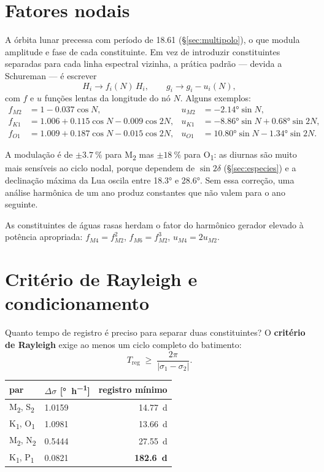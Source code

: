 \documentclass[11pt,a4paper,oneside]{report}
\theoremstyle{definition}
\theoremstyle{plain}
\theoremstyle{remark}
\begin{document}
\section{Fatores nodais}

A órbita lunar precessa com período de \SI{18.61}{\anos} (\S\ref{sec:multipolo}),
o que modula amplitude e fase de cada constituinte. Em vez de introduzir
constituintes separadas para cada linha espectral vizinha, a prática padrão —
devida a Schureman — é escrever
\begin{equation}
H_i\to f_i(N)\,H_i,\qquad g_i\to g_i-u_i(N),
\end{equation}
com $f$ e $u$ funções lentas da longitude do nó $N$. Alguns exemplos:
\begin{align}
f_{M2}&=1-\num{0.037}\cos N, & u_{M2}&=-\ang{2.14}\sin N,\\
f_{K1}&=\num{1.006}+\num{0.115}\cos N-\num{0.009}\cos 2N,
& u_{K1}&=-\ang{8.86}\sin N+\ang{0.68}\sin 2N,\\
f_{O1}&=\num{1.009}+\num{0.187}\cos N-\num{0.015}\cos 2N,
& u_{O1}&=\ang{10.80}\sin N-\ang{1.34}\sin 2N .
\end{align}

A modulação é de $\pm\SI{3.7}{\percent}$ para M\textsubscript{2} mas
$\pm\SI{18}{\percent}$ para O\textsubscript{1}: as diurnas são muito mais
sensíveis ao ciclo nodal, porque dependem de $\sin 2\delta$
(\S\ref{sec:especies}) e a declinação máxima da Lua oscila entre \ang{18.3} e
\ang{28.6}. Sem essa correção, uma análise harmônica de um ano produz
constantes que não valem para o ano seguinte.

As constituintes de águas rasas herdam o fator do harmônico gerador elevado à
potência apropriada: $f_{M4}=f_{M2}^{2}$, $f_{M6}=f_{M2}^{3}$,
$u_{M4}=2u_{M2}$.

\section{Critério de Rayleigh e condicionamento}
\label{sec:rayleigh}

Quanto tempo de registro é preciso para separar duas constituintes? O
\textbf{critério de Rayleigh} exige ao menos um ciclo completo do batimento:
\begin{equation}
T_{\text{reg}}\;\ge\;\frac{2\pi}{|\sigma_1-\sigma_2|} .
\label{eq:rayleigh}
\end{equation}

\begin{center}
\begin{tabular}{@{}llr@{}}
\toprule
par & $\Delta\sigma$ [\si{\degree\per\hour}] & registro mínimo \\
\midrule
M\textsubscript{2}, S\textsubscript{2} & \num{1.0159} & \SI{14.77}{\day} \\
K\textsubscript{1}, O\textsubscript{1} & \num{1.0981} & \SI{13.66}{\day} \\
M\textsubscript{2}, N\textsubscript{2} & \num{0.5444} & \SI{27.55}{\day} \\
K\textsubscript{1}, P\textsubscript{1} & \num{0.0821} & \textbf{\SI{182.6}{\day}} \\
\bottomrule
\end{tabular}
\end{center}
\end{document}
